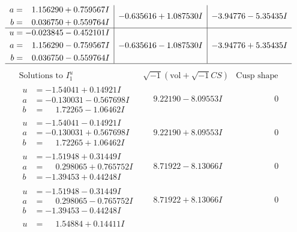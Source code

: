 \documentclass[1p]{elsarticle_modified}
\theoremstyle{definition}
\newcommand{\I}{\sqrt{-1}}
\begin{document}
$$\begin{array}{c|c|c}
\begin{aligned}
a &= \phantom{-}1.156290 + 0.759567 I \\
b &= \phantom{-}0.036750 + 0.559764 I\end{aligned}
 & -0.635616 + 1.087530 I & -3.94776 - 5.35435 I \\ \hline\begin{aligned}
u &= -0.023845 - 0.452101 I \\
a &= \phantom{-}1.156290 - 0.759567 I \\
b &= \phantom{-}0.036750 - 0.559764 I\end{aligned}
 & -0.635616 - 1.087530 I & -3.94776 + 5.35435 I\\
 \hline 
 \end{array}$$\newpage$$\begin{array}{c|c|c}  
\text{Solutions to }I^u_{1}& \I (\text{vol} + \sqrt{-1}CS) & \text{Cusp shape}\\
 \hline 
\begin{aligned}
u &= -1.54041 + 0.14921 I \\
a &= -0.130031 - 0.567698 I \\
b &= \phantom{-}1.72265 - 1.06462 I\end{aligned}
 & \phantom{-}9.22190 - 8.09553 I & \phantom{-0.000000 } 0 \\ \hline\begin{aligned}
u &= -1.54041 - 0.14921 I \\
a &= -0.130031 + 0.567698 I \\
b &= \phantom{-}1.72265 + 1.06462 I\end{aligned}
 & \phantom{-}9.22190 + 8.09553 I & \phantom{-0.000000 } 0 \\ \hline\begin{aligned}
u &= -1.51948 + 0.31449 I \\
a &= \phantom{-}0.298065 + 0.765752 I \\
b &= -1.39453 + 0.44248 I\end{aligned}
 & \phantom{-}8.71922 - 8.13066 I & \phantom{-0.000000 } 0 \\ \hline\begin{aligned}
u &= -1.51948 - 0.31449 I \\
a &= \phantom{-}0.298065 - 0.765752 I \\
b &= -1.39453 - 0.44248 I\end{aligned}
 & \phantom{-}8.71922 + 8.13066 I & \phantom{-0.000000 } 0 \\ \hline\begin{aligned}
u &= \phantom{-}1.54884 + 0.14411 I \\

\end{aligned}
\end{array}$$
\end{document}
